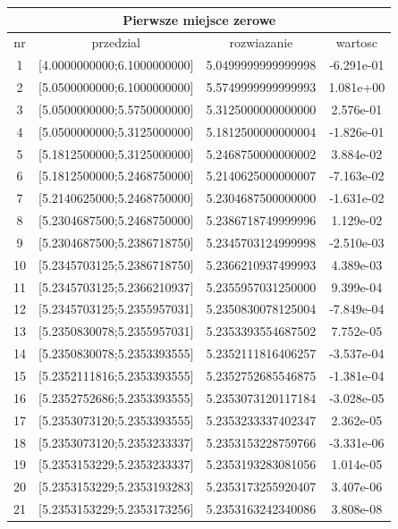 \documentclass[polish, 11pt, oneside]{article}   	%
\begin{document}
\begin{center}
\begin{tabular}{ |c|c|c|c| } 
\hline
\multicolumn{4}{|c|}{Pierwsze miejsce zerowe} \\
 \hline
 nr & przedzial & rozwiazanie & wartosc \\
 \hline
1 & [4.0000000000;6.1000000000] & 5.0499999999999998 &   -6.291e-01 \\ 
  2 & [5.0500000000;6.1000000000] & 5.5749999999999993 &    1.081e+00 \\ 
  3 & [5.0500000000;5.5750000000] & 5.3125000000000000 &    2.576e-01 \\ 
  4 & [5.0500000000;5.3125000000] & 5.1812500000000004 &   -1.826e-01 \\ 
  5 & [5.1812500000;5.3125000000] & 5.2468750000000002 &    3.884e-02 \\ 
  6 & [5.1812500000;5.2468750000] & 5.2140625000000007 &   -7.163e-02 \\ 
  7 & [5.2140625000;5.2468750000] & 5.2304687500000000 &   -1.631e-02 \\ 
  8 & [5.2304687500;5.2468750000] & 5.2386718749999996 &    1.129e-02 \\ 
  9 & [5.2304687500;5.2386718750] & 5.2345703124999998 &   -2.510e-03 \\ 
 10 & [5.2345703125;5.2386718750] & 5.2366210937499993 &    4.389e-03 \\ 
 11 & [5.2345703125;5.2366210937] & 5.2355957031250000 &    9.399e-04 \\ 
 12 & [5.2345703125;5.2355957031] & 5.2350830078125004 &   -7.849e-04 \\ 
 13 & [5.2350830078;5.2355957031] & 5.2353393554687502 &    7.752e-05 \\ 
 14 & [5.2350830078;5.2353393555] & 5.2352111816406257 &   -3.537e-04 \\ 
 15 & [5.2352111816;5.2353393555] & 5.2352752685546875 &   -1.381e-04 \\ 
 16 & [5.2352752686;5.2353393555] & 5.2353073120117184 &   -3.028e-05 \\ 
 17 & [5.2353073120;5.2353393555] & 5.2353233337402347 &    2.362e-05 \\ 
 18 & [5.2353073120;5.2353233337] & 5.2353153228759766 &   -3.331e-06 \\ 
 19 & [5.2353153229;5.2353233337] & 5.2353193283081056 &    1.014e-05 \\ 
 20 & [5.2353153229;5.2353193283] & 5.2353173255920407 &    3.407e-06 \\ 
 21 & [5.2353153229;5.2353173256] & 5.2353163242340086 &    3.808e-08 \\ 

\end{tabular}
\end{center}
\end{document}
